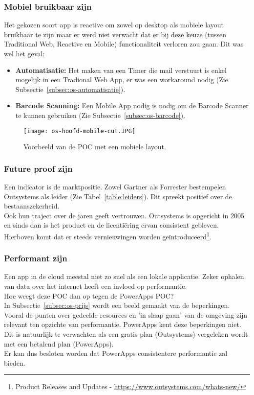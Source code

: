 \subsubsection{Mobiel bruikbaar zijn}

Het gekozen soort app is reactive om zowel op desktop als mobiele layout bruikbaar te zijn maar er werd niet verwacht dat er bij deze keuze (tussen Traditional Web, Reactive en Mobile) functionaliteit verloren zou gaan. Dit was wel het geval:
\begin{itemize}
    \item \textbf{Automatisatie:} Het maken van een Timer die mail verstuurt is enkel mogelijk in een Tradional Web App, er was een workaround nodig (Zie Subsectie~\ref{subsec:os-automatisatie}).
    \item \textbf{Barcode Scanning:} Een Mobile App nodig is nodig om de Barcode Scanner te kunnen gebruiken (Zie Subsectie~\ref{subsec:os-barcode}).
\end{itemize}

\begin{figure}[h!]
    \centering
    \texttt{[image: os-hoofd-mobile-cut.JPG]}
    \caption{Voorbeeld van de POC met een mobiele layout.}
    \label{fig:os-hoofd-mobile}
\end{figure}

\subsubsection{Future proof zijn}

Een indicator is de marktpositie. Zowel Gartner als Forrester bestempelen Outsystems als leider (Zie Tabel~\ref{table:leiders}). Dit spreekt positief over de bestaanszekerheid.\\
Ook hun traject over de jaren geeft vertrouwen.
Outsystems is opgericht in 2005 en sinds dan is het product en de licentiëring ervan consistent gebleven.\\
Hierboven komt dat er steeds vernieuwingen worden geïntroduceerd\footnote{Product Releases and Updates - \url{https://www.outsystems.com/whats-new/}}.

\subsubsection{Performant zijn}

Een app in de cloud meestal niet zo snel als een lokale applicatie. Zeker ophalen van data over het internet heeft een invloed op performantie.\\
Hoe weegt deze POC dan op tegen de PowerApps POC?\\
In Subsectie~\ref{subsec:os-prijs} wordt een beeld gemaakt van de beperkingen. Vooral de punten over gedeelde resources en 'in slaap gaan' van de omgeving zijn relevant ten opzichte van performantie. PowerApps kent deze beperkingen niet. Dit is natuurlijk te verwachten als een gratis plan (Outsystems) vergeleken wordt met een betalend plan (PowerApps).\\
Er kan dus besloten worden dat PowerApps consistentere performantie zal bieden.


